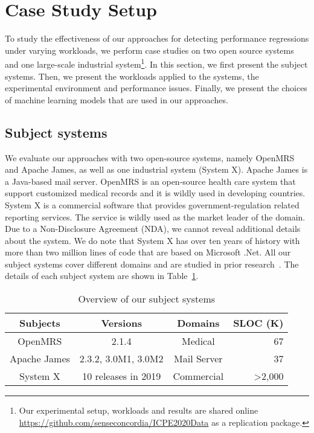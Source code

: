 \section{Case Study Setup} \label{sec:casestudysetup}
To study the effectiveness of our approaches for detecting performance regressions under varying workloads, we perform case studies on two open source systems and one large-scale industrial system\footnote{Our experimental setup, workloads and results are shared online \url{https://github.com/senseconcordia/ICPE2020Data} as a replication package.}. In this section, we first present the subject systems. Then, we present the workloads applied to the systems, the experimental environment and performance issues. Finally, we present the choices of machine learning models that are used in our approaches. 

\subsection{Subject systems}
We evaluate our approaches with two open-source systems, namely OpenMRS and Apache James, as well as one industrial system (System X). Apache James is a Java-based mail server. OpenMRS is an open-source health care system that support customized medical records and it is wildly used in developing countries. System X is a commercial software that provides government-regulation related reporting services. The service is wildly used as the market leader of the domain. Due to a Non-Disclosure Agreement (NDA), we cannot reveal additional details about the system. We do note that System X has over ten years of history with more than two million lines of code that are based on Microsoft .Net. All our subject systems cover different domains and are studied in prior research~\citep{Yao:2018:LSL:3184407.3184416, DBLP:conf/icst/GaoJBL16}. The details of each subject system are shown in Table~\ref{tab:subjects}. 


\begin{table}[tbh]
  \centering
  \caption{Overview of our subject systems}
    \begin{tabular}{c|c|c|r}
    \hline
    Subjects & Versions & Domains & SLOC (K) \\
    \hline
    OpenMRS & 2.1.4 & Medical & 67 \\
    
    Apache James & 2.3.2, 3.0M1, 3.0M2 & Mail Server & 37 \\
    
    System X & 10 releases in 2019 & Commercial & \textgreater 2,000 \\
    \hline
    \end{tabular}%
  \label{tab:subjects}%
\end{table}%


